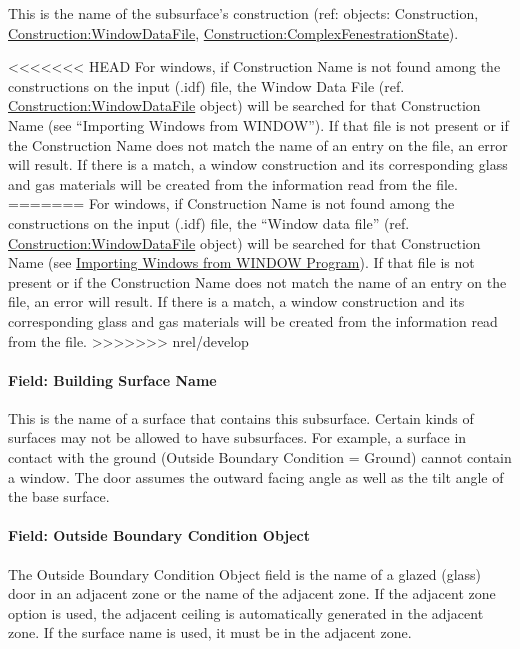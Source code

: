 This is the name of the subsurface's construction (ref: objects: Construction, \hyperref[constructionwindowdatafile]{Construction:WindowDataFile}, \hyperref[constructioncomplexfenestrationstate]{Construction:ComplexFenestrationState}).

<<<<<<< HEAD
For windows, if Construction Name is not found among the constructions on the input (.idf) file, the Window Data File (ref. \hyperref[constructionwindowdatafile]{Construction:WindowDataFile} object) will be searched for that Construction Name (see ``Importing Windows from WINDOW''). If that file is not present or if the Construction Name does not match the name of an entry on the file, an error will result. If there is a match, a window construction and its corresponding glass and gas materials will be created from the information read from the file.
=======
For windows, if Construction Name is not found among the constructions on the input (.idf) file, the ``Window data file'' (ref. \hyperref[constructionwindowdatafile]{Construction:WindowDataFile} object) will be searched for that Construction Name (see \hyperref[importing-windows-from-window-program]{Importing Windows from WINDOW Program}). If that file is not present or if the Construction Name does not match the name of an entry on the file, an error will result. If there is a match, a window construction and its corresponding glass and gas materials will be created from the information read from the file.
>>>>>>> nrel/develop

\paragraph{Field: Building Surface Name}\label{field-building-surface-name-5}

This is the name of a surface that contains this subsurface. Certain kinds of surfaces may not be allowed to have subsurfaces. For example, a surface in contact with the ground (Outside Boundary Condition = Ground) cannot contain a window. The door assumes the outward facing angle as well as the tilt angle of the base surface.

\paragraph{Field: Outside Boundary Condition Object}\label{field-outside-boundary-condition-object-5}

The Outside Boundary Condition Object field is the name of a glazed (glass) door in an adjacent zone or the name of the adjacent zone. If the adjacent zone option is used, the adjacent ceiling is automatically generated in the adjacent zone. If the surface name is used, it must be in the adjacent zone.

